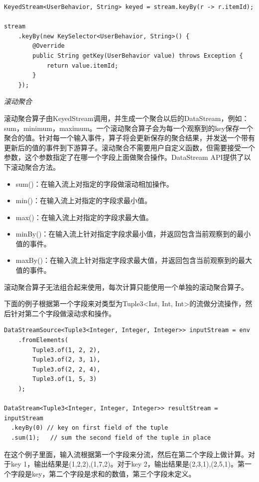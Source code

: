\documentclass[cn,11pt,chinese]{elegantbook}
\begin{document}
\begin{verbatim}
KeyedStream<UserBehavior, String> keyed = stream.keyBy(r -> r.itemId);

stream
    .keyBy(new KeySelector<UserBehavior, String>() {
        @Override
        public String getKey(UserBehavior value) throws Exception {
            return value.itemId;
        }
    });
\end{verbatim}

\textit{滚动聚合}

滚动聚合算子由KeyedStream调用，并生成一个聚合以后的DataStream，例如：sum，minimum，maximum。一个滚动聚合算子会为每一个观察到的key保存一个聚合的值。针对每一个输入事件，算子将会更新保存的聚合结果，并发送一个带有更新后的值的事件到下游算子。滚动聚合不需要用户自定义函数，但需要接受一个参数，这个参数指定了在哪一个字段上面做聚合操作。DataStream API提供了以下滚动聚合方法。

\begin{itemize}
    \item sum()：在输入流上对指定的字段做滚动相加操作。
    \item min()：在输入流上对指定的字段求最小值。
    \item max()：在输入流上对指定的字段求最大值。
    \item minBy()：在输入流上针对指定字段求最小值，并返回包含当前观察到的最小值的事件。
    \item maxBy()：在输入流上针对指定字段求最大值，并返回包含当前观察到的最大值的事件。
\end{itemize}

滚动聚合算子无法组合起来使用，每次计算只能使用一个单独的滚动聚合算子。

下面的例子根据第一个字段来对类型为Tuple3<Int, Int, Int>的流做分流操作，然后针对第二个字段做滚动求和操作。

\begin{verbatim}
DataStreamSource<Tuple3<Integer, Integer, Integer>> inputStream = env
    .fromElements(
        Tuple3.of(1, 2, 2),
        Tuple3.of(2, 3, 1),
        Tuple3.of(2, 2, 4),
        Tuple3.of(1, 5, 3)
    );

DataStream<Tuple3<Integer, Integer, Integer>> resultStream = inputStream
  .keyBy(0) // key on first field of the tuple
  .sum(1);   // sum the second field of the tuple in place
\end{verbatim}

在这个例子里面，输入流根据第一个字段来分流，然后在第二个字段上做计算。对于key 1，输出结果是(1,2,2),(1,7,2)。对于key 2，输出结果是(2,3,1),(2,5,1)。第一个字段是key，第二个字段是求和的数值，第三个字段未定义。
\end{document}
